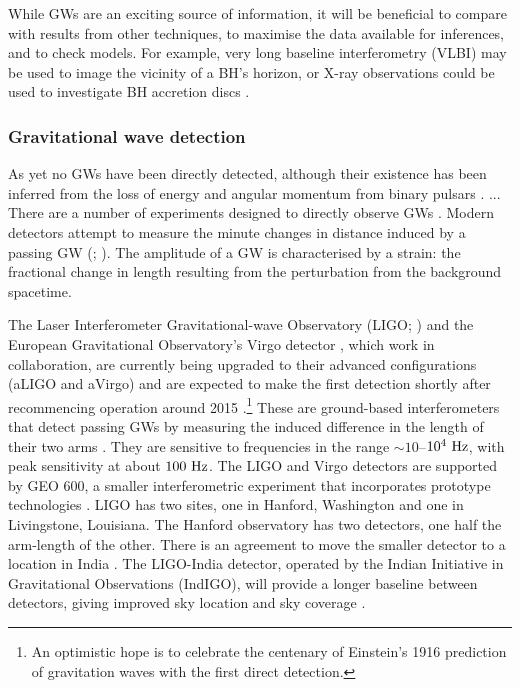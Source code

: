 While GWs are an exciting source of information, it will be beneficial to compare with results from other techniques, to maximise the data available for inferences, and to check models. For example, very long baseline interferometry (VLBI) may be used to image the vicinity of a BH's horizon, or X-ray observations could be used to investigate BH accretion discs \citep{Psaltis2008}.

\subsubsection{Gravitational wave detection}\label{sec:GW-det}

As yet no GWs have been directly detected, although their existence has been inferred from the loss of energy and angular momentum from binary pulsars \citep{Stairs2003}. ... There are a number of experiments designed to directly observe GWs \citep{Riles2012}. Modern detectors attempt to measure the minute changes in distance induced by a passing GW (\citealt[section 9.5]{Thorne1987}; \citealt[section 18.9]{Hobson2006}). The amplitude of a GW is characterised by a strain: the fractional change in length resulting from the perturbation from the background spacetime.

The Laser Interferometer Gravitational-wave Observatory (LIGO; \citealt{Abramovici1992}) and the European Gravitational Observatory's Virgo detector \citep{Acernese2008a}, which work in collaboration, are currently being upgraded to their advanced configurations (aLIGO and aVirgo) and are expected to make the first detection shortly after recommencing operation around 2015 \citep{Harry2010,Accadia2011}.\footnote{An optimistic hope is to celebrate the centenary of Einstein's 1916 prediction of gravitation waves \citep[document 32]{Einstein1997} with the first direct detection.} These are ground-based interferometers that detect passing GWs by measuring the induced difference in the length of their two arms \citep{Pitkin2011}. They are sensitive to frequencies in the range $\sim10$--$10^4~\mathrm{Hz}$, with peak sensitivity at about $100~\mathrm{Hz}$. The LIGO and Virgo detectors are supported by GEO 600, a smaller interferometric experiment that incorporates prototype technologies \citep{Willke2002,Willke2006}. LIGO has two sites, one in Hanford, Washington and one in Livingstone, Louisiana. The Hanford observatory has two detectors, one half the arm-length of the other. There is an agreement to move the smaller detector to a location in India \citep{Unnikrishnan2013}. The LIGO-India detector, operated by the Indian Initiative in Gravitational Observations (IndIGO), will provide a longer baseline between detectors, giving improved sky location and sky coverage \citep{Schutz2011}.

